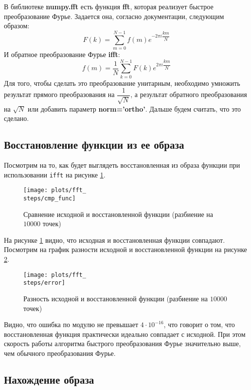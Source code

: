 В библиотеке \textbf{numpy.fft} есть функция \textbf{fft}, которая реализует быстрое преобразование Фурье. Задается она, согласно документации, следующим образом:
\begin{equation}
    F(k) = \sum_{m=0}^{N-1} f(m) e^{-2\pi i \dfrac{k m}{N}} 
\end{equation}
И обратное преобразование Фурье \textbf{ifft}: 
\begin{equation}
    f(m) = \frac{1}{N} \sum_{k=0}^{N-1} F(k) e^{2\pi i \dfrac{k m}{N}}
\end{equation}
Для того, чтобы сделать это преобразование унитарным, необходимо 
умножить результат прямого преобразования на $\dfrac{1}{\sqrt{N}}$, а результат обратного преобразования на $\sqrt{N}$ или добавить параметр \textbf{norm='ortho'}. Дальше будем считать, что это сделано.

\subsection{Восстановление функции из ее образа}
\def\steps{10000}
Посмотрим на то, как будет выглядеть восстановленная из образа функции при использовании \texttt{ifft} на рисунке \ref{fig:\steps_ifft_cmp}.
\begin{figure}[ht!]
    \centering
    \texttt{[image: plots/fft\_\\steps/cmp\_func]}
    \caption{Сравнение исходной и восстановленной функции (разбиение на $\steps$ точек)}
    \label{fig:\steps_ifft_cmp}
\end{figure}

На рисунке \ref{fig:\steps_ifft_cmp} видно, что исходная и восстановленная функции совпадают. 
Посмотрим на график разности исходной и восстановленной функции на рисунке \ref{fig:\steps_ifft_error}.
\begin{figure}[ht!]
    \centering
    \texttt{[image: plots/fft\_\\steps/error]}
    \caption{Разность исходной и восстановленной функции (разбиение на $\steps$ точек)}
    \label{fig:\steps_ifft_error}
\end{figure}

Видно, что ошибка по модулю не превышает $4 \cdot 10^{-16}$, что говорит о том, что восстановленная функция практически идеально совпадает с исходной.
При этом скорость работы алгоритма быстрого преобразования Фурье значительно выше, чем обычного преобразования Фурье.

\subsection{Нахождение образа}

